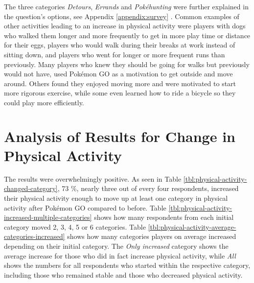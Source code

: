 The three categories \emph{Detours}, \emph{Errands} and \emph{Pokéhunting} were further explained in the question's options, see Appendix \ref{appendix:survey} . Common examples of other activities leading to an increase in physical activity were players with dogs who walked them longer and more frequently to get in more play time or distance for their eggs, players who would walk during their breaks at work instead of sitting down, and players who went for longer or more frequent runs than previously. Many players who knew they should be going for walks but previously would not have, used Pokémon GO as a motivation to get outside and move around. Others found they enjoyed moving more and were motivated to start more rigorous exercise, while some even learned how to ride a bicycle so they could play more efficiently. 


\section{Analysis of Results for Change in Physical Activity}

The results were overwhelmingly positive. As seen in Table \ref{tbl:physical-activity-changed-category}, 73 \%, nearly three out of every four respondents, increased their physical activity enough to move up at least one category in physical activity after Pokémon GO compared to before. Table \ref{tbl:physical-activity-increased-multiple-categories} shows how many respondents from each initial category moved 2, 3, 4, 5 or 6 categories. Table \ref{tbl:physical-activity-average-categories-increased} shows how many categories players on average increased depending on their initial category. The \emph{Only increased} category shows the average increase for those who did in fact increase physical activity, while \emph{All} shows the numbers for all respondents who started within the respective category, including those who remained stable and those who decreased physical activity. 

